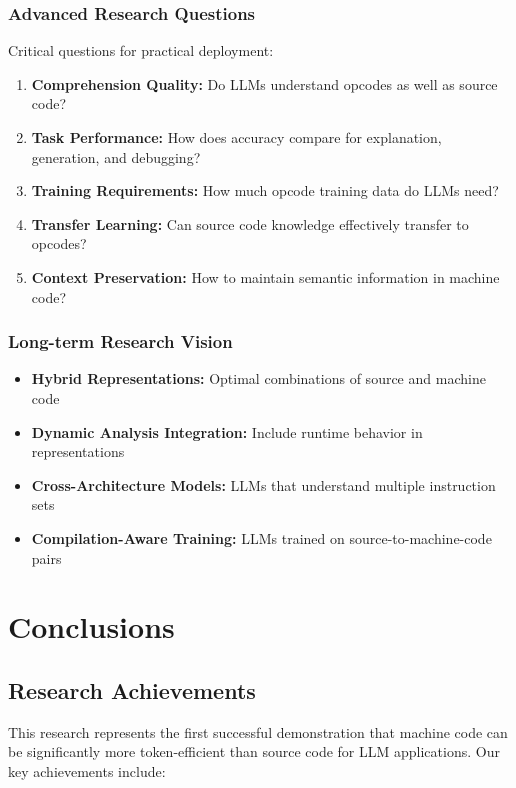 \documentclass[11pt,a4paper]{article}
\begin{document}
\subsubsection{Advanced Research Questions}
Critical questions for practical deployment:
\begin{enumerate}
    \item \textbf{Comprehension Quality:} Do LLMs understand opcodes as well as source code?
    \item \textbf{Task Performance:} How does accuracy compare for explanation, generation, and debugging?
    \item \textbf{Training Requirements:} How much opcode training data do LLMs need?
    \item \textbf{Transfer Learning:} Can source code knowledge effectively transfer to opcodes?
    \item \textbf{Context Preservation:} How to maintain semantic information in machine code?
\end{enumerate}

\subsubsection{Long-term Research Vision}
\begin{itemize}
    \item \textbf{Hybrid Representations:} Optimal combinations of source and machine code
    \item \textbf{Dynamic Analysis Integration:} Include runtime behavior in representations
    \item \textbf{Cross-Architecture Models:} LLMs that understand multiple instruction sets
    \item \textbf{Compilation-Aware Training:} LLMs trained on source-to-machine-code pairs
\end{itemize}

\section{Conclusions}

\subsection{Research Achievements}
This research represents the first successful demonstration that machine code can be significantly more token-efficient than source code for LLM applications. Our key achievements include:
\end{document}

